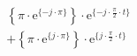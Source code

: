 \[
\begin{split}
&  \left \{ \pi \cdot \textrm{e}^{\{-j \cdot \pi \}} \right \} \cdot \textrm{e}^{\{- j \cdot \frac{\pi}{2} \cdot t \}}\\
& +\left \{ \pi \cdot \textrm{e}^{\{ j \cdot \pi \}} \right \} \cdot \textrm{e}^{\{  j \cdot \frac{\pi}{2} \cdot t \}}
\end{split}
\]
